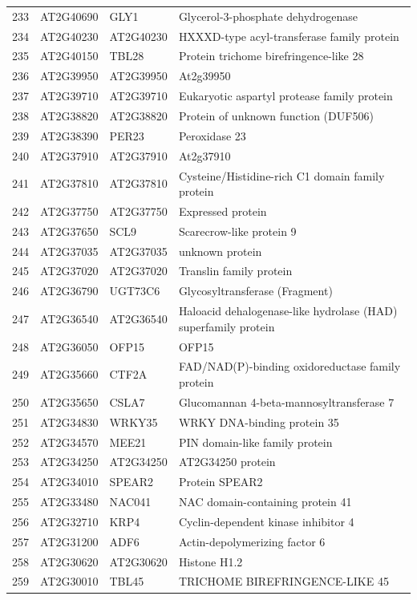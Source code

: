 \documentclass[11pt]{article}
\begin{document}
\begin{center}
\begin{tabular}{rlll}
233 & AT2G40690 & GLY1 & Glycerol-3-phosphate dehydrogenase\\
234 & AT2G40230 & AT2G40230 & HXXXD-type acyl-transferase family protein\\
235 & AT2G40150 & TBL28 & Protein trichome birefringence-like 28\\
236 & AT2G39950 & AT2G39950 & At2g39950\\
237 & AT2G39710 & AT2G39710 & Eukaryotic aspartyl protease family protein\\
238 & AT2G38820 & AT2G38820 & Protein of unknown function (DUF506)\\
239 & AT2G38390 & PER23 & Peroxidase 23\\
240 & AT2G37910 & AT2G37910 & At2g37910\\
241 & AT2G37810 & AT2G37810 & Cysteine/Histidine-rich C1 domain family protein\\
242 & AT2G37750 & AT2G37750 & Expressed protein\\
243 & AT2G37650 & SCL9 & Scarecrow-like protein 9\\
244 & AT2G37035 & AT2G37035 & unknown protein\\
245 & AT2G37020 & AT2G37020 & Translin family protein\\
246 & AT2G36790 & UGT73C6 & Glycosyltransferase (Fragment)\\
247 & AT2G36540 & AT2G36540 & Haloacid dehalogenase-like hydrolase (HAD) superfamily protein\\
248 & AT2G36050 & OFP15 & OFP15\\
249 & AT2G35660 & CTF2A & FAD/NAD(P)-binding oxidoreductase family protein\\
250 & AT2G35650 & CSLA7 & Glucomannan 4-beta-mannosyltransferase 7\\
251 & AT2G34830 & WRKY35 & WRKY DNA-binding protein 35\\
252 & AT2G34570 & MEE21 & PIN domain-like family protein\\
253 & AT2G34250 & AT2G34250 & AT2G34250 protein\\
254 & AT2G34010 & SPEAR2 & Protein SPEAR2\\
255 & AT2G33480 & NAC041 & NAC domain-containing protein 41\\
256 & AT2G32710 & KRP4 & Cyclin-dependent kinase inhibitor 4\\
257 & AT2G31200 & ADF6 & Actin-depolymerizing factor 6\\
258 & AT2G30620 & AT2G30620 & Histone H1.2\\
259 & AT2G30010 & TBL45 & TRICHOME BIREFRINGENCE-LIKE 45\\

\end{tabular}
\end{center}
\end{document}
